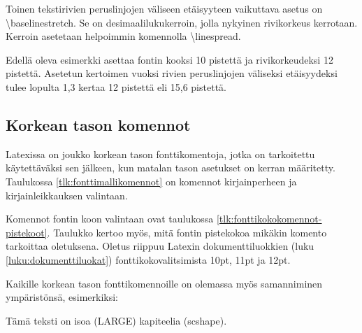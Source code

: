 \documentclass[a4paper,10pt,notitlepage,oneside]{book}
\newcommand{\keno}{\textbackslash}
\newcommand{\koodi}[1]{\textsf{#1}}
\begin{document}
Toinen tekstirivien peruslinjojen väliseen etäisyyteen vaikuttava asetus
on \koodi{\keno base\-line\-stretch}. Se on desimaalilukukerroin, jolla
nykyinen rivikorkeus kerrotaan. Kerroin asetetaan helpoimmin komennolla
\koodi{\keno line\-spread}.

\begin{koodilohkosis}
  \fontsize{10pt}{12pt} \linespread{1.3} \selectfont
\end{koodilohkosis}

Edellä oleva esimerkki asettaa fontin kooksi 10 pistettä ja
rivikorkeudeksi 12 pistettä. Asetetun kertoimen vuoksi rivien
peruslinjojen väliseksi etäisyydeksi tulee lopulta 1,3 kertaa 12
pistettä eli 15,6 pistettä.

\subsection{Korkean tason komennot}

Latexissa on joukko korkean tason fontti\-komentoja, jotka on
tarkoitettu käytettäväksi sen jälkeen, kun matalan tason asetukset on
kerran määritetty. Taulukossa \ref{tlk:fonttimallikomennot} on komennot
kirjainperheen ja kirjainleikkauksen valintaan.

Komennot fontin koon valintaan ovat taulukossa
\ref{tlk:fonttikokokomennot-pistekoot}. Taulukko kertoo myös, mitä
fontin pistekokoa mikäkin komento tarkoittaa oletuksena. Oletus riippuu
Latexin dokumenttiluokkien (luku \ref{luku:dokumenttiluokat})
fonttikokovalitsimista \koodi{10pt, 11pt} ja \koodi{12pt}.

Kaikille korkean tason fonttikomennoille on olemassa myös samanniminen
ympäristönsä, esimerkiksi:

\begin{koodilohkosis}
  \begin{LARGE}
    \begin{scshape}
      Tämä teksti on isoa (LARGE) kapiteelia (scshape).
    \end{scshape}
  \end{LARGE}
\end{koodilohkosis}
\end{document}
